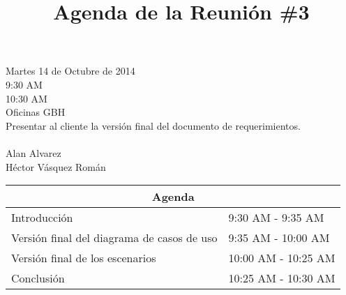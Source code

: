\documentclass{article}
\begin{document}
\title{\bfseries Agenda de la Reuni\'{o}n \#3}
\date{}
\maketitle

 Martes 14 de Octubre de 2014\\
 9:30 AM\\
 10:30 AM\\
 Oficinas GBH\\[0.3in]
 Presentar al cliente la versi\'{o}n final del documento de requerimientos.\\[0.3in]
\\
\indent Alan Alvarez\\
\indent H\'{e}ctor V\'{a}squez Rom\'{a}n\\[0.3in]    
\begin{center}
    \begin{tabular}{|l|l|}
        \hline
        \multicolumn{2}{|c|}{\bfseries Agenda}\\
        \hline
        Introducci\'{o}n&9:30 AM - 9:35 AM\\
        \hline
        Versi\'{o}n final del diagrama de casos de uso&9:35 AM - 10:00 AM\\
        \hline
        Versi\'{o}n final de los escenarios&10:00 AM - 10:25 AM\\
        \hline
        Conclusi\'{o}n&10:25 AM - 10:30 AM\\
        \hline
    \end{tabular}
\end{center}
\end{document}
